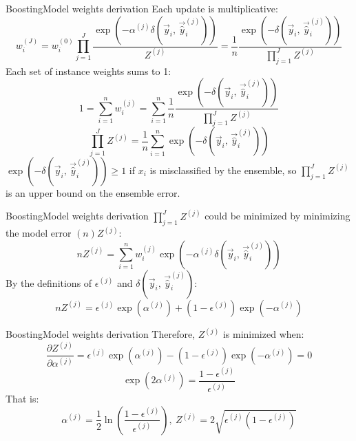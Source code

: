 \documentclass[10pt]{beamer}
\begin{document}
\begin{frame}{Boosting}{Model weights derivation}
  Each update is multiplicative:
  \begin{equation*}
    w^{(J)}_i
    =
    w^{(0)}_i
    \prod_{j=1}^{J}
    \frac{\exp(-\alpha^{(j)}\delta(\vec{y}_i,\,\vec{\hat{y}}_i^{(j)}))}{Z^{(j)}}
    =
    \frac{1}{n}
    \frac{\exp(-\delta(\vec{y}_i,\,\vec{\hat{y}}_i^{(j)}))}{\prod_{j=1}^{J}Z^{(j)}}
  \end{equation*}
  Each set of instance weights sums to 1:
  \begin{equation*}
    1
    =
    \sum_{i = 1}^{n}w^{(j)}_i
    =
    \sum_{i = 1}^{n}
    \frac{1}{n}
    \frac{\exp(-\delta(\vec{y}_i,\,\vec{\hat{y}}_i^{(j)}))}{\prod_{j=1}^{J}Z^{(j)}}
  \end{equation*}
  \begin{equation*}
    \prod_{j=1}^{J}
    Z^{(j)} = \frac{1}{n}\sum_{i = 1}^{n}
    \exp(-\delta(\vec{y}_i,\,\vec{\hat{y}}_i^{(j)}))
  \end{equation*}
  $\exp(-\delta(\vec{y}_i,\,\vec{\hat{y}}_i^{(j)})) \geq 1$ if $x_i$ is
  misclassified by the ensemble, so $\prod_{j=1}^{J} Z^{(j)}$ is an upper bound
  on the ensemble error.
\end{frame}

\begin{frame}{Boosting}{Model weights derivation}
  $\prod_{j=1}^{J} Z^{(j)}$ could be minimized by minimizing the model error $(n)$$Z^{(j)}$:
    \begin{equation*}
      n Z^{(j)}
      =
      \sum_{i = 1}^{n} w^{(j)}_i \exp(-\alpha^{(j)}\delta(\vec{y}_i,\,\vec{\hat{y}}_i^{(j)}))
    \end{equation*}
    By the definitions of $\epsilon^{(j)}$ and $\delta(\vec{y}_i,\,\vec{\hat{y}}_i^{(j)})$:
  \begin{equation*}
    n Z^{(j)}
    =
    \epsilon^{(j)} \exp(\alpha^{(j)})
    +
    (1 - \epsilon^{(j)}) \exp(-\alpha^{(j)})
  \end{equation*}
\end{frame}

\begin{frame}{Boosting}{Model weights derivation}
  Therefore, $Z^{(j)}$ is minimized when:
  \begin{equation*}
    \frac{\partial Z^{(j)}}{\partial \alpha^{(j)}}
    =
    \epsilon^{(j)} \exp(\alpha^{(j)})
    -
    (1 - \epsilon^{(j)}) \exp(-\alpha^{(j)})
    =
    0
  \end{equation*}
  \begin{equation*}
    \exp(2\alpha^{(j)})
    =
    \frac{1 - \epsilon^{(j)}}{\epsilon^{(j)}}
  \end{equation*}
  That is:
  \begin{equation*}
    \alpha^{(j)}
    =
    \frac{1}{2}\ln\left(\frac{1 - \epsilon^{(j)}}{\epsilon^{(j)}}\right)
    ,\
    Z^{(j)}
    =
    2\sqrt{\epsilon^{(j)}(1 - \epsilon^{(j)})}
  \end{equation*}
\end{frame}
\end{document}
